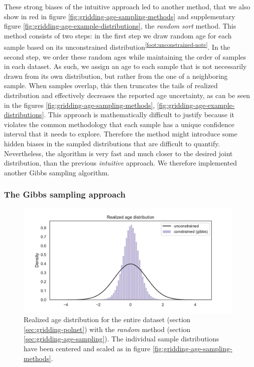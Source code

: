 \begin{refsection}
These strong biases of the intuitive approach led to another method, that we also show in red in figure \ref{fig:gridding-age-sampling-methods} and supplementary figure \ref{fig:gridding-age-example-distributions}, the \textit{random sort} method. This method consists of two steps: in the first step we draw random age for each sample based on its unconstrained distribution\textsuperscript{\ref{foot:unconstrained-note}}. In the second step, we order these random ages while maintaining the order of samples in each dataset. As such, we assign an age to each sample that is not necessarily drawn from its own distribution, but rather from the one of a neighboring sample. When samples overlap, this then truncates the tails of realized distribution and effectively decreases the reported age uncertainty, as can be seen in the figures \ref{fig:gridding-age-sampling-methods}, \ref{fig:gridding-age-example-distributions}. This approach is mathematically difficult to justify because it violates the common methodology that each sample has a unique confidence interval that it needs to explore. Therefore the method might introduce some hidden biases in the sampled distributions that are difficult to quantify. Nevertheless, the algorithm is very fast and much closer to the desired joint distribution, than the previous \textit{intuitive} approach. We therefore implemented another Gibbs sampling algorithm.


\subsubsection{The Gibbs sampling approach}

\begin{figure}
	\includegraphics[width=\linewidth]{gridding-figures/full-realized-age-distribution.pdf}
	\caption[Realized age distribution for the entire dataset]{Realized age distribution for the entire dataset (section \ref{sec:gridding-polnet}) with the \textit{random} method (section \ref{sec:gridding-age-sampling}). The individual sample distributions have been centered and scaled as in figure \ref{fig:gridding-age-sampling-methods}.}
	\label{fig:gridding-full-age-distribution}
\end{figure}


\end{refsection}

